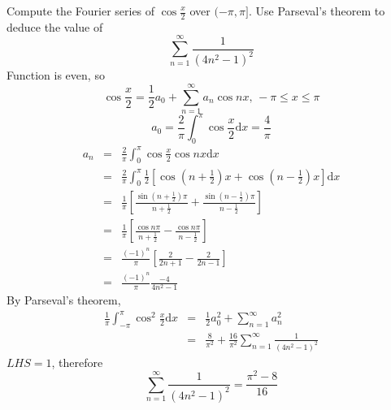 \documentclass[12pt]{report}
\theoremstyle{definition}
\begin{document}
\begin{ex}
    Compute the Fourier series of $\cos{\frac{x}{2}}$ over $(-\pi, \pi]$. %
    Use Parseval's theorem to deduce the value of\[
        \sum_{n=1}^{\infty} \frac{1}{{(4n^{2} - 1)}^{2}}
    \]
    Function is even, so\[
        \cos{\frac{x}{2}} = \frac{1}{2} a_0 + \sum_{n=1}^{\infty} a_n \cos{nx}, \,-\pi \le x \le \pi
    \]\[
    a_0 = \frac{2}{\pi}\int_{0}^{\pi} \cos{\frac{x}{2}}\mathrm{d}x = \frac{4}{\pi}
    \]
    \begin{eqnarray*}
        a_n &=& \frac{2}{\pi} \int_{0}^{\pi} \cos{\frac{x}{2}} \cos{nx} \mathrm{d}x \\
            &=& \frac{2}{\pi} \int_{0}^{\pi} \frac{1}{2} 
            \left[\cos{\left(n+\frac{1}{2}\right)x} + \cos{\left(n-\frac{1}{2}\right)x}\right] \mathrm{d}x \\
            &=& \frac{1}{\pi} \left[\frac{\sin{(n+\frac{1}{2})\pi}}{n+\frac{1}{2}} 
            + \frac{\sin{(n-\frac{1}{2})\pi}}{n-\frac{1}{2}}\right] \\
            &=& \frac{1}{\pi}\left[\frac{\cos{n\pi}}{n+\frac{1}{2}} - \frac{\cos{n\pi}}{n-\frac{1}{2}}\right] \\
            &=& \frac{{(-1)}^{n}}{\pi}\left[\frac{2}{2n+1} - \frac{2}{2n-1}\right] \\
            &=& \frac{{(-1)}^{n}}{\pi} \frac{-4}{4n^{2}-1}
    \end{eqnarray*}
    By Parseval's theorem,
    \begin{eqnarray*}
        \frac{1}{\pi}\int_{-\pi}^{\pi} \cos^{2}{\frac{x}{2}} \mathrm{d}x
        &=& \frac{1}{2}a_0^{2} + \sum_{n=1}^{\infty} a_n^{2} \\
        &=& \frac{8}{\pi^{2}} + \frac{16}{\pi^{2}}\sum_{n=1}^{\infty} \frac{1}{{(4n^{2} - 1)}^{2}}
    \end{eqnarray*}
    $LHS = 1$, therefore\[
        \sum_{n=1}^{\infty} \frac{1}{{(4n^{2} - 1)}^{2}} = \frac{\pi^{2}- 8}{16}
    \]
\end{ex}
\end{document}
